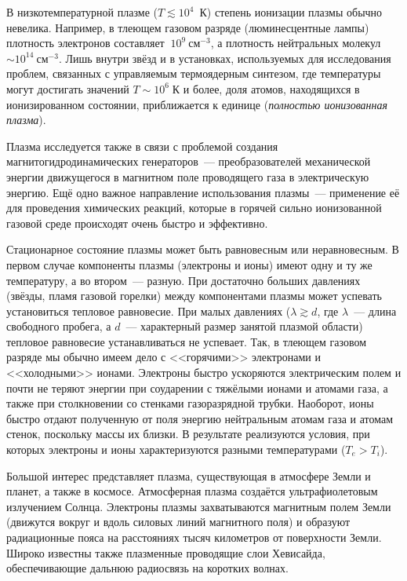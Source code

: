 В низкотемпературной плазме ($T\lesssim 10^4$~К) степень ионизации плазмы
обычно невелика. Например, в тлеющем газовом разряде (люминесцентные лампы)
плотность электронов составляет $~10^9~\text{см}^{-3}$,
а плотность нейтральных молекул ${\sim}10^{14}~\text{см}^{-3}$.
Лишь внутри звёзд и в установках, используемых для исследования проблем,
связанных с управляемым термоядерным синтезом,
где температуры могут достигать значений $T \sim 10^{6}\;К$ и более,
доля атомов, находящихся в ионизированном состоянии, приближается
к единице (\emph{полностью ионизованная плазма}).

Плазма исследуется также в связи с проблемой создания магнитогидродинамических
генераторов~--- преобразователей
механической энергии движущегося в магнитном поле проводящего газа в
электрическую энергию. Ещё одно важное направление использования плазмы~---
применение её для проведения химических реакций, которые в горячей
сильно ионизованной газовой среде происходят очень быстро и эффективно.


Стационарное состояние плазмы может быть равновесным или неравновесным.
В первом случае компоненты плазмы (электроны и ионы) имеют одну и ту же температуру,
а во втором~--- разную. При достаточно больших
давлениях (звёзды, пламя газовой горелки) между компонентами плазмы может
успевать установиться тепловое равновесие. При
малых давлениях ($\lambda\gtrsim d$, где $\lambda$~--- длина свободного пробега, а
$d$~--- характерный размер занятой
плазмой области) тепловое равновесие устанавливаться не успевает.
Так, в тлеющем газовом разряде мы обычно имеем дело с
<<горячими>> электронами и <<холодными>> ионами.
Электроны быстро ускоряются электрическим полем и почти не теряют
энергии при соударении с тяжёлыми ионами и атомами газа, а также при
столкновении со стенками газоразрядной трубки. Наоборот, ионы быстро отдают
полученную от поля энергию нейтральным атомам газа и атомам стенок, поскольку
массы их близки. В результате реализуются условия, при которых электроны
и ионы характеризуются разными температурами ($T_e > T_i$).

Большой интерес представляет плазма, существующая в атмосфере Земли и планет, а
также в космосе. Атмосферная плазма создаётся ультрафиолетовым излучением
Солнца. Электроны плазмы захватываются магнитным полем Земли (движутся вокруг и
вдоль силовых линий магнитного поля) и образуют радиационные пояса на
расстояниях тысяч километров от поверхности Земли. Широко известны также
плазменные проводящие слои Хевисайда, обеспечивающие дальнюю радиосвязь
на коротких волнах.


